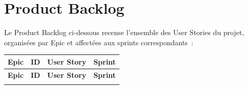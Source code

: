 \section{Product Backlog}
\label{sec:backlog}

Le Product Backlog ci-dessous recense l'ensemble des User Stories du projet, organisées par Epic et affectées aux sprints correspondants~:

\begin{longtable}{|c|c|p{7.5cm}|c|}
\hline
\textbf{Epic} & \textbf{ID} & \textbf{User Story} & \textbf{Sprint} \\
\hline
\endfirsthead
\hline
\textbf{Epic} & \textbf{ID} & \textbf{User Story} & \textbf{Sprint} \\
\hline
\endhead
\hline
\endfoot


\end{longtable}
